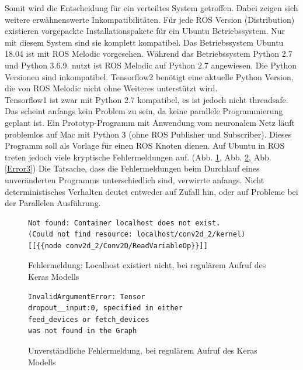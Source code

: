 \documentclass[conference]{IEEEtran}
\begin{document}
Somit wird die Entscheidung für ein verteiltes System getroffen. Dabei 
zeigen sich weitere erwähnenswerte Inkompatibilitäten. Für jede ROS 
Version (Distribution) existieren vorgepackte Installationspakete für ein 
Ubuntu Betriebssystem. Nur mit diesem System sind sie komplett 
kompatibel. Das Betriebssystem Ubuntu 18.04 ist mit ROS Melodic 
vorgesehen. Während das Betriebssystem Python 2.7 und Python 3.6.9. 
nutzt ist ROS Melodic auf Python 2.7 angewiesen. Die Python Versionen sind 
inkompatibel. Tensorflow2 benötigt eine aktuelle Python Version, die von 
ROS Melodic nicht ohne Weiteres unterstützt wird. \\

Tensorflow1 ist zwar mit Python 2.7 kompatibel, es ist jedoch nicht 
threadsafe. Das scheint anfangs kein Problem zu sein, da keine parallele 
	Programmierung geplant ist. Ein Prototyp-Programm mit Anwendung vom 
	neuronalem Netz läuft problemlos auf Mac mit Python 3 (ohne ROS 
	Publisher und Subscriber). Dieses Programm 
	soll als Vorlage für einen ROS Knoten dienen. Auf Ubuntu in ROS treten 
	jedoch viele kryptische Fehlermeldungen auf. (Abb. \ref{Error1}, Abb. \ref{Error2}, Abb. \ref{Error3}) 
	Die Tatsache, dass die Fehlermeldungen beim Durchlauf eines 
	unveränderten Programms unterschiedlich sind, verwirrte anfangs. 
	Nicht deterministisches Verhalten deutet entweder auf Zufall hin, 
	oder auf Probleme bei der Parallelen Ausführung. 
	
	\begin{figure}
		\centering
		\begin{verbatim}
Not found: Container localhost does not exist. 
(Could not find resource: localhost/conv2d_2/kernel)
[[{{node conv2d_2/Conv2D/ReadVariableOp}}]]
\end{verbatim}
		\label{Error1}
		\caption{Fehlermeldung: Localhost existiert nicht, bei regulärem 
		Aufruf 
		des Keras Modells}
	\end{figure}
	
	\begin{figure}
		\centering
		\begin{verbatim}
InvalidArgumentError: Tensor 
dropout__input:0, specified in either 
feed_devices or fetch_devices
was not found in the Graph
		\end{verbatim}
		\label{Error2}
		\caption{Unverständliche Fehlermeldung, bei regulärem Aufruf 
			des Keras Modells}
	\end{figure}
		
\end{document}
